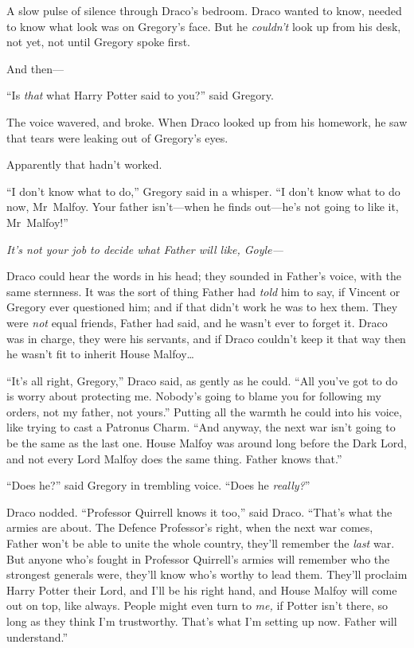 A slow pulse of silence through Draco’s bedroom. Draco wanted to know, needed to know what look was on Gregory’s face. But he \emph{couldn’t} look up from his desk, not yet, not until Gregory spoke first.

And then—

“Is \emph{that} what Harry Potter said to you?” said Gregory.

The voice wavered, and broke. When Draco looked up from his homework, he saw that tears were leaking out of Gregory’s eyes.

Apparently that hadn’t worked.

“I don’t know what to do,” Gregory said in a whisper. “I don’t know what to do now, Mr~Malfoy. Your father isn’t—when he finds out—he’s not going to like it, Mr~Malfoy!”

\emph{It’s not \emph{your} job to decide what Father will like, Goyle—}

Draco could hear the words in his head; they sounded in Father’s voice, with the same sternness. It was the sort of thing Father had \emph{told} him to say, if Vincent or Gregory ever questioned him; and if that didn’t work he was to hex them. They were \emph{not} equal friends, Father had said, and he wasn’t ever to forget it. Draco was in charge, they were his servants, and if Draco couldn’t keep it that way then he wasn’t fit to inherit House Malfoy…

“It’s all right, Gregory,” Draco said, as gently as he could. “All you’ve got to do is worry about protecting me. Nobody’s going to blame you for following my orders, not my father, not yours.” Putting all the warmth he could into his voice, like trying to cast a Patronus Charm. “And anyway, the next war isn’t going to be the same as the last one. House Malfoy was around long before the Dark Lord, and not every Lord Malfoy does the same thing. Father knows that.”

“Does he?” said Gregory in trembling voice. “Does he \emph{really?}”

Draco nodded. “Professor Quirrell knows it too,” said Draco. “That’s what the armies are about. The Defence Professor’s right, when the next war comes, Father won’t be able to unite the whole country, they’ll remember the \emph{last} war. But anyone who’s fought in Professor Quirrell’s armies will remember who the strongest generals were, they’ll know who’s worthy to lead them. They’ll proclaim Harry Potter their Lord, and I’ll be his right hand, and House Malfoy will come out on top, like always. People might even turn to \emph{me,} if Potter isn’t there, so long as they think I’m trustworthy. That’s what I’m setting up now. Father will understand.”

